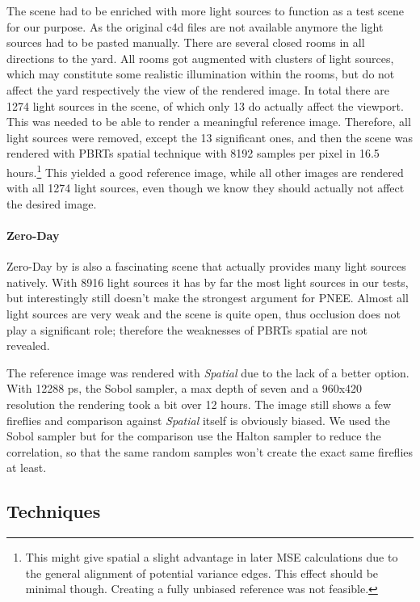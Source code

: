 The scene had to be enriched with more light sources to function as a test scene for our purpose. As the original c4d files are not available anymore the light sources had to be pasted manually. There are several closed rooms in all directions to the yard. All rooms got augmented with clusters of light sources, which may constitute some realistic illumination within the rooms, but do not affect the yard respectively the view of the rendered image. In total there are 1274 light sources in the scene, of which only 13 do actually affect the viewport. This was needed to be able to render a meaningful reference image. Therefore, all light sources were removed, except the 13 significant ones, and then the scene was rendered with PBRTs spatial technique with 8192 samples per pixel in 16.5 hours.\footnote{This might give spatial a slight advantage in later MSE calculations due to the general alignment of potential variance edges. This effect should be minimal though. Creating a fully unbiased reference was not feasible.} This yielded a good reference image, while all other images are rendered with all 1274 light sources, even though we know they should actually not affect the desired image.

\paragraph{Zero-Day}

Zero-Day by \textcite{Beeple} is also a fascinating scene that actually provides many light sources natively. With 8916 light sources it has by far the most light sources in our tests, but interestingly still doesn't make the strongest argument for PNEE. Almost all light sources are very weak and the scene is quite open, thus occlusion does not play a significant role; therefore the weaknesses of PBRTs spatial are not revealed.

The reference image was rendered with \textit{Spatial} due to the lack of a better option. With 12288 ps, the Sobol sampler, a max depth of seven and a 960x420 resolution the rendering took a bit over 12 hours. The image still shows a few fireflies and comparison against \textit{Spatial} itself is obviously biased. We used the Sobol sampler but for the comparison use the Halton sampler to reduce the correlation, so that the same random samples won't create the exact same fireflies at least.



\FloatBarrier
\subsection{Techniques}

